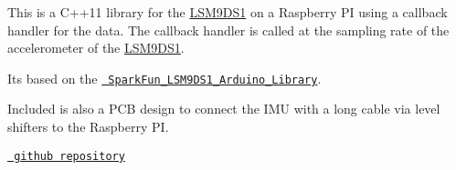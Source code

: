 This is a C++11 library for the \mbox{\hyperlink{classLSM9DS1}{L\+S\+M9\+D\+S1}} on a Raspberry PI using a callback handler for the data. The callback handler is called at the sampling rate of the accelerometer of the \mbox{\hyperlink{classLSM9DS1}{L\+S\+M9\+D\+S1}}.

It\textquotesingle{}s based on the \href{https://github.com/sparkfun/SparkFun_LSM9DS1_Arduino_Library}{\texttt{ Spark\+Fun\+\_\+\+L\+S\+M9\+D\+S1\+\_\+\+Arduino\+\_\+\+Library}}.

Included is also a P\+CB design to connect the I\+MU with a long cable via level shifters to the Raspberry PI.

\href{https://github.com/berndporr/LSM9DS1_RaspberryPi_CPP_Library}{\texttt{ github repository}} 